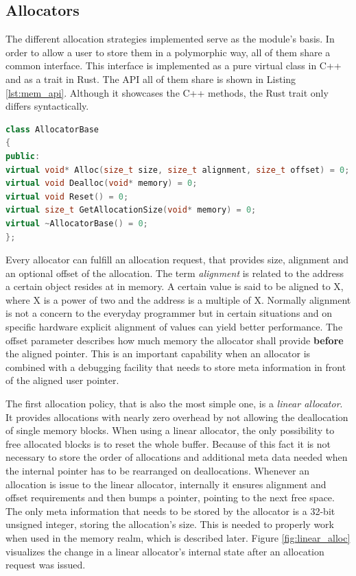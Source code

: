 \clearpage

\subsection{Allocators}

The different allocation strategies implemented serve as the module's basis. In order to allow a user to store them in a polymorphic way, all of them share a common interface. This interface is implemented as a pure virtual class in C++ and as a trait in Rust. The \ac{API} all of them share is shown in Listing \ref{lst:mem_api}. Although it showcases the C++ methods, the Rust trait only differs syntactically.\\

\begin{lstlisting}[caption={Common interface among all allocator implementation. Rust trait only differs syntactically from this C++ sample.}, label={lst:mem_api}, language={C++}]
class AllocatorBase
{
public:
virtual void* Alloc(size_t size, size_t alignment, size_t offset) = 0;
virtual void Dealloc(void* memory) = 0;
virtual void Reset() = 0;
virtual size_t GetAllocationSize(void* memory) = 0;
virtual ~AllocatorBase() = 0;
};
\end{lstlisting}

\noindent
Every allocator can fulfill an allocation request, that provides size, alignment and an optional offset of the allocation.  The term \textit{alignment} is related to the address a certain object resides at in memory. A certain value is said to be aligned to X, where X is a power of two and the address is a multiple of X. Normally alignment is not a concern to the everyday programmer but in certain situations and on specific hardware explicit alignment of values can yield better performance. The offset parameter describes how much memory the allocator shall provide \textbf{before} the aligned pointer. This is an important capability when an allocator is combined with a debugging facility that needs to store meta information in front of the aligned user pointer. 

The first allocation policy, that is also the most simple one, is a \textit{linear allocator}. It provides allocations with nearly zero overhead by not allowing the deallocation of single memory blocks. When using a linear allocator, the only possibility to free allocated blocks is to reset the whole buffer. Because of this fact it is not necessary to store the order of allocations and additional meta data needed when the internal pointer has to be rearranged on deallocations. Whenever an allocation is issue to the linear allocator, internally it ensures alignment and offset requirements and then bumps a pointer, pointing to the next free space. The only meta information that needs to be stored by the allocator is a 32-bit unsigned integer, storing the allocation's size. This is needed to properly work when used in the memory realm, which is described later. Figure \ref{fig:linear_alloc} visualizes the change in a linear allocator's internal state after an allocation request was issued.

